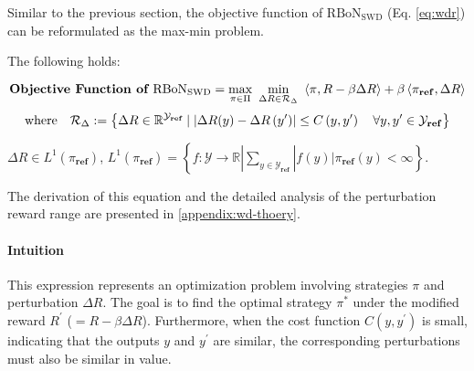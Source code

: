 Similar to the previous section, the objective function of $\mathrm{RBoN}_{\mathrm{SWD}}$ (Eq. \ref{eq:wdr}) can be reformulated as the max-min problem. 
\begin{theorem}\label{theory:wd}
The following holds:

\begin{equation*}
    \textnormal{\textbf{Objective Function of $\mathrm{RBoN}_{\mathrm{SWD}}$}} = \max_{\pi \in \Pi} \,\,\min_{\Delta R \in \mathcal{R}_{\Delta}}\,\, \left\langle \pi, R - \beta \Delta R \right\rangle + \beta \left\langle \pi_{\textnormal{\textbf{ref}}}, \Delta R \right\rangle
\end{equation*}
\begin{equation*}
\text{where}\quad \mathcal{R}_{\Delta}:=\left\{\Delta R \in \mathbb{R}^{\mathcal{Y}_{\textbf{ref}}} \mid \left|\Delta R(y)-\Delta R\left(y^{\prime}\right)\right| \leq C\left(y, y^{\prime}\right) \quad \forall y, y^{\prime} \in \mathcal{Y}_{\textnormal{\textbf{ref}}}\right\}
\end{equation*}
\end{theorem}
$\Delta R \in L^1(\pi_{\textbf{ref}})$, $L^1(\pi_{\textbf{ref}})=\left\{f:  \mathcal{Y} \rightarrow \mathbb{R}| \sum_{y \in \mathcal{Y}_{\textbf{ref}}}|f(y)|  \pi_{\textbf{ref}}(y)<\infty\right\}$. 


The derivation of this equation and the detailed analysis of the perturbation reward range are presented in \cref{appendix:wd-thoery}.

\paragraph{Intuition}

This expression represents an optimization problem involving strategies $\pi$ and perturbation $\Delta R$. The goal is to find the optimal strategy $\pi^*$ under the modified reward $R^\prime$ ($= R-\beta \Delta R$). Furthermore, when the cost function $C(y,y^\prime)$ is small, indicating that the outputs $y$ and $y^\prime$ are similar, the corresponding perturbations must also be similar in value.
